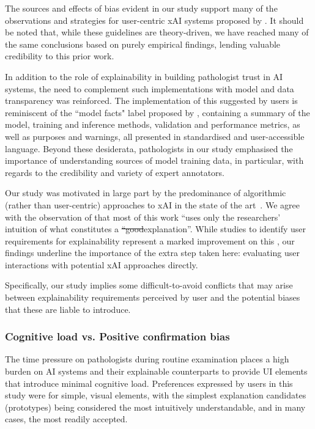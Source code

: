 \documentclass[final,5p,times,twocolumn,hyphens]{elsarticle}
\providecommand{\DIFaddtex}[1]{{\protect\color{blue}\uwave{#1}}} %
\providecommand{\DIFdeltex}[1]{{\protect\color{red}\sout{#1}}}                      %
\providecommand{\DIFaddbegin}{} %
\providecommand{\DIFaddend}{} %
\providecommand{\DIFdelbegin}{} %
\providecommand{\DIFdelend}{} %
\providecommand{\DIFadd}[1]{\texorpdfstring{\DIFaddtex{#1}}{#1}} %
\providecommand{\DIFdel}[1]{\texorpdfstring{\DIFdeltex{#1}}{}} %
\newcommand{\DIFscaledelfig}{0.5}
\newlength{\DIFdelgraphicswidth} %
\newlength{\DIFdelgraphicsheight} %
\newcommand{\DIFaddincludegraphics}[2][]{{\color{blue}\fbox{\DIFOincludegraphics[#1]{#2}}}} %
\newcommand{\DIFdelincludegraphics}[2][]{%
\sbox{\DIFdelgraphicsbox}{\DIFOincludegraphics[#1]{#2}}%
\settoboxwidth{\DIFdelgraphicswidth}{\DIFdelgraphicsbox} %
\settoboxtotalheight{\DIFdelgraphicsheight}{\DIFdelgraphicsbox} %
\scalebox{\DIFscaledelfig}{%
\parbox[b]{\DIFdelgraphicswidth}{\usebox{\DIFdelgraphicsbox}\\[-\baselineskip] \rule{\DIFdelgraphicswidth}{0em}}\llap{\resizebox{\DIFdelgraphicswidth}{\DIFdelgraphicsheight}{%
\setlength{\unitlength}{\DIFdelgraphicswidth}%
\begin{picture}(1,1)%
\thicklines\linethickness{2pt} %
{\color[rgb]{1,0,0}\put(0,0){\framebox(1,1){}}}%
{\color[rgb]{1,0,0}\put(0,0){\line( 1,1){1}}}%
{\color[rgb]{1,0,0}\put(0,1){\line(1,-1){1}}}%
\end{picture}%
}\hspace*{3pt}}} %
} %
\DeclareRobustCommand{\DIFaddbegin}{\DIFOaddbegin \let\includegraphics\DIFaddincludegraphics} %
\DeclareRobustCommand{\DIFaddend}{\DIFOaddend \let\includegraphics\DIFOincludegraphics} %
\DeclareRobustCommand{\DIFdelbegin}{\DIFOdelbegin \let\includegraphics\DIFdelincludegraphics} %
\DeclareRobustCommand{\DIFdelend}{\DIFOaddend \let\includegraphics\DIFOincludegraphics} %
\begin{document}
The sources and effects of bias evident in our study support many of the observations and strategies for user-centric xAI systems proposed by \citet{wang_designing_2019}. It should be noted that, while these guidelines are theory-driven, we have reached many of the same conclusions based on purely empirical findings, lending valuable credibility to this prior work.

In addition to the role of explainability in building pathologist trust in AI systems, the need to complement such implementations with model and data transparency was reinforced. The implementation of this suggested by users is reminiscent of the ``model facts" label proposed by \citet{sendak2020presenting}, containing a summary of the model, training and inference methods, validation and performance metrics, as well as purposes and warnings, all presented in standardised and user-accessible language. Beyond these desiderata, pathologists in our study emphasised the importance of understanding sources of model training data, in particular, with regards to the credibility and variety of expert annotators.

Our study was motivated in large part by the predominance of algorithmic (rather than user-centric) approaches to xAI \DIFaddbegin \DIFadd{represented }\DIFaddend in the state of the art~\cite{tjoa_survey_2020, poceviciute_survey_2020, antoniadi2021current}. We agree with the observation of \citet{miller2019explanation} that most of this work ``uses only the researchers' intuition of what constitutes a \DIFdelbegin \DIFdel{``good}\DIFdelend \DIFaddbegin \DIFadd{`good' }\DIFaddend explanation''.  While studies to identify user requirements for explainability represent a marked improvement on this \DIFaddbegin \DIFadd{approach}\DIFaddend , our findings underline the importance of the extra step taken here: evaluating user interactions with potential xAI approaches directly.

Specifically, our study implies some difficult-to-avoid conflicts that may arise between explainability requirements perceived by user and the potential biases that these are liable to introduce.

\subsubsection{Cognitive load vs. Positive confirmation bias}

The time pressure on pathologists during routine examination places a high burden on AI systems and their explainable counterparts to provide UI elements that introduce minimal cognitive load. Preferences expressed by users in this study were for simple, visual elements, with the simplest explanation candidates (prototypes) being considered the most intuitively understandable, and in many cases, the most readily accepted.
\end{document}
